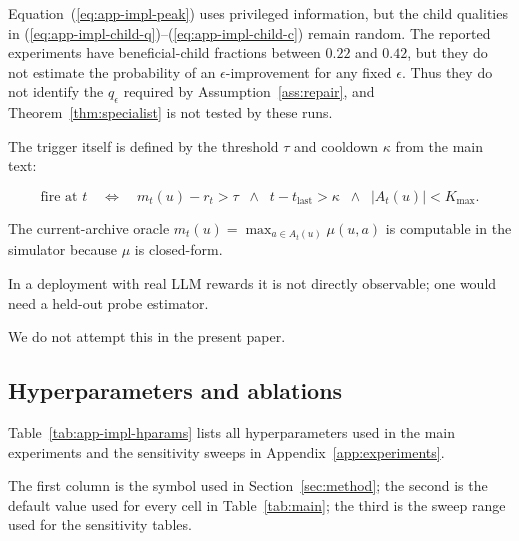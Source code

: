 \documentclass{article} %
\renewcommand{\eqref}[1]{\textup{(\ref{#1})}}
\begin{document}
Equation~\eqref{eq:app-impl-peak} uses privileged information, but the child
qualities in \eqref{eq:app-impl-child-q}--\eqref{eq:app-impl-child-c} remain
random. The reported experiments have beneficial-child fractions between \(0.22\) and
\(0.42\), but they do not estimate the probability of an
\(\epsilon\)-improvement for any fixed \(\epsilon\). Thus they do not identify
the \(q_\epsilon\) required by Assumption~\ref{ass:repair}, and
Theorem~\ref{thm:specialist} is not tested by these runs.

The trigger itself is defined by the threshold $\tau$ and cooldown $\kappa$ from the main text:

\begin{equation}
\label{eq:app-impl-trigger}
\text{fire at } t \quad\Longleftrightarrow\quad m_t(u) - r_t > \tau \;\;\wedge\;\; t - t_{\text{last}} > \kappa \;\;\wedge\;\; |A_t(u)| < K_{\max}.
\end{equation}

The current-archive oracle $m_t(u) = \max_{a \in A_t(u)} \mu(u, a)$ is computable in the simulator because $\mu$ is closed-form.

In a deployment with real LLM rewards it is not directly observable; one would need a held-out probe estimator.

We do not attempt this in the present paper.

\subsection{Hyperparameters and ablations}

\label{app:impl-hparams}

Table~\ref{tab:app-impl-hparams} lists all hyperparameters used in the main experiments and the sensitivity sweeps in Appendix~\ref{app:experiments}.

The first column is the symbol used in Section~\ref{sec:method}; the second is the default value used for every cell in Table~\ref{tab:main}; the third is the sweep range used for the sensitivity tables.
\end{document}
